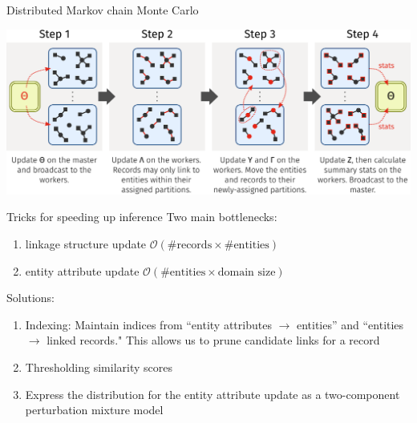 \documentclass[compress]{beamer}
\newcommand{\1}[1]{\mathbb{I}\!\left[#1\right]} %
\theoremstyle{plain}
\begin{document}
\begin{frame}{Distributed Markov chain Monte Carlo}
  
  \begin{center}
    \includegraphics[width=\linewidth]{./figures/distributed-transition-operator.pdf}
  \end{center}
\end{frame}


\begin{frame}{Tricks for speeding up inference}
  Two main bottlenecks:
  \begin{enumerate}
    \item linkage structure update 
    $\mathcal{O}(\text{\# records} \times \text{\# entities})$ 
    \item entity attribute update 
    $\mathcal{O}(\text{\# entities} \times \text{domain size})$   \end{enumerate}
  
   \vspace*{2em}
   
  \pause
   Solutions:
   \begin{enumerate}
      \item Indexing: Maintain indices from ``entity attributes $\to$ entities'' and 
      ``entities $\to$ linked records." This allows us to prune candidate links for a record
   \item Thresholding similarity scores
    \item Express the distribution for the entity attribute update as a 
      two-component perturbation mixture model
   \end{enumerate}
   \end{frame}
\end{document}
